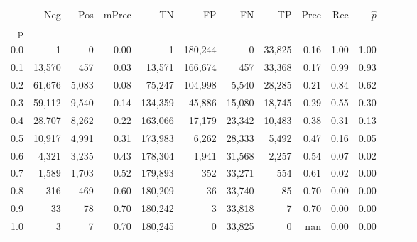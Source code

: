 \begin{tabular}{rrrrrrrrrrrrrr}
\toprule
{} &     Neg &    Pos & mPrec &       TN &       FP &      FN &      TP &  Prec &   Rec & $\hat{p}$ \\
p   &         &        &       &          &          &         &         &       &       &           \\
\midrule
0.0 &       1 &      0 &  0.00 &        1 &  180,244 &       0 &  33,825 &  0.16 &  1.00 &      1.00 \\
0.1 &  13,570 &    457 &  0.03 &   13,571 &  166,674 &     457 &  33,368 &  0.17 &  0.99 &      0.93 \\
0.2 &  61,676 &  5,083 &  0.08 &   75,247 &  104,998 &   5,540 &  28,285 &  0.21 &  0.84 &      0.62 \\
0.3 &  59,112 &  9,540 &  0.14 &  134,359 &   45,886 &  15,080 &  18,745 &  0.29 &  0.55 &      0.30 \\
0.4 &  28,707 &  8,262 &  0.22 &  163,066 &   17,179 &  23,342 &  10,483 &  0.38 &  0.31 &      0.13 \\
0.5 &  10,917 &  4,991 &  0.31 &  173,983 &    6,262 &  28,333 &   5,492 &  0.47 &  0.16 &      0.05 \\
0.6 &   4,321 &  3,235 &  0.43 &  178,304 &    1,941 &  31,568 &   2,257 &  0.54 &  0.07 &      0.02 \\
0.7 &   1,589 &  1,703 &  0.52 &  179,893 &      352 &  33,271 &     554 &  0.61 &  0.02 &      0.00 \\
0.8 &     316 &    469 &  0.60 &  180,209 &       36 &  33,740 &      85 &  0.70 &  0.00 &      0.00 \\
0.9 &      33 &     78 &  0.70 &  180,242 &        3 &  33,818 &       7 &  0.70 &  0.00 &      0.00 \\
1.0 &       3 &      7 &  0.70 &  180,245 &        0 &  33,825 &       0 &   nan &  0.00 &      0.00 \\
\bottomrule
\end{tabular}
